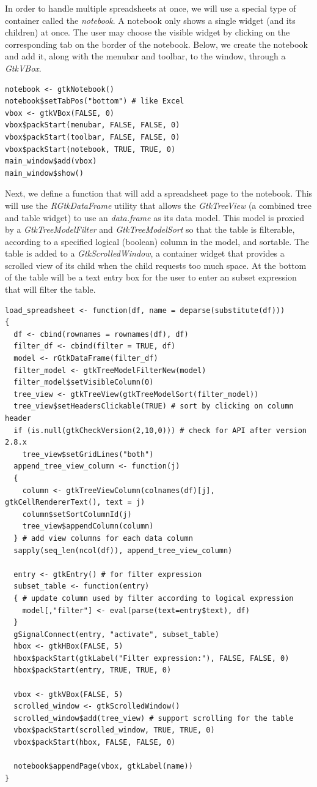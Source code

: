 \documentclass[article]{jss}
\begin{document}
In order to handle multiple spreadsheets at once, we will use a special type
of container called the \emph{notebook}. A notebook only shows a single widget
(and its children) at once. The user may choose the visible widget by 
clicking on the corresponding tab on the border of the notebook. Below,
we create the notebook and add it, along with the menubar and toolbar, to the
window, through a \emph{GtkVBox}.
\begin{verbatim}
notebook <- gtkNotebook()
notebook$setTabPos("bottom") # like Excel
vbox <- gtkVBox(FALSE, 0)
vbox$packStart(menubar, FALSE, FALSE, 0)
vbox$packStart(toolbar, FALSE, FALSE, 0)
vbox$packStart(notebook, TRUE, TRUE, 0)
main_window$add(vbox)
main_window$show()
\end{verbatim}
Next, we define a function that will add a spreadsheet page to the notebook.
This will use the \emph{RGtkDataFrame} utility that allows
the \emph{GtkTreeView} (a combined tree and table widget) to use an 
\emph{data.frame} as its data model. This model is proxied by a \emph{GtkTreeModelFilter}
and \emph{GtkTreeModelSort} so that the table is filterable, according to
a specified logical (boolean) column in the model, and sortable. 
The table is added to a \emph{GtkScrolledWindow},
a container widget that provides a scrolled view of its child when the child
requests too much space.
At the bottom of the table will be a text entry
box for the user to enter an  subset expression that will filter the table.
\begin{verbatim}
load_spreadsheet <- function(df, name = deparse(substitute(df)))
{
  df <- cbind(rownames = rownames(df), df)
  filter_df <- cbind(filter = TRUE, df)
  model <- rGtkDataFrame(filter_df)
  filter_model <- gtkTreeModelFilterNew(model)
  filter_model$setVisibleColumn(0)
  tree_view <- gtkTreeView(gtkTreeModelSort(filter_model))
  tree_view$setHeadersClickable(TRUE) # sort by clicking on column header
  if (is.null(gtkCheckVersion(2,10,0))) # check for API after version 2.8.x
    tree_view$setGridLines("both")
  append_tree_view_column <- function(j)
  {
    column <- gtkTreeViewColumn(colnames(df)[j], gtkCellRendererText(), text = j)
    column$setSortColumnId(j)
    tree_view$appendColumn(column)
  } # add view columns for each data column
  sapply(seq_len(ncol(df)), append_tree_view_column)
  
  entry <- gtkEntry() # for filter expression
  subset_table <- function(entry)
  { # update column used by filter according to logical expression
    model[,"filter"] <- eval(parse(text=entry$text), df)
  }
  gSignalConnect(entry, "activate", subset_table)
  hbox <- gtkHBox(FALSE, 5)
  hbox$packStart(gtkLabel("Filter expression:"), FALSE, FALSE, 0)
  hbox$packStart(entry, TRUE, TRUE, 0)
  
  vbox <- gtkVBox(FALSE, 5)
  scrolled_window <- gtkScrolledWindow()
  scrolled_window$add(tree_view) # support scrolling for the table
  vbox$packStart(scrolled_window, TRUE, TRUE, 0)
  vbox$packStart(hbox, FALSE, FALSE, 0)
  
  notebook$appendPage(vbox, gtkLabel(name))
}
\end{verbatim}
\end{document}
